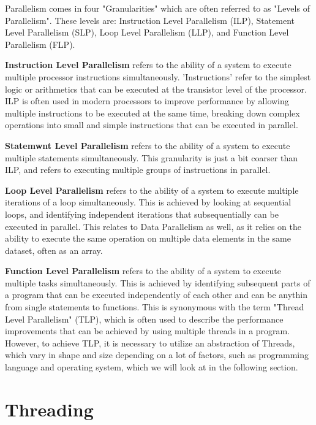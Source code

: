 \documentclass[12pt,a4paper]{article}
\begin{document}
Parallelism comes in four "Granularities"\parencite[p. 4, 114]{Rauber2023} which are often referred to as "Levels of Parallelism". These levels are: Instruction Level Parallelism (ILP), Statement Level Parallelism (SLP), Loop Level Parallelism (LLP), and Function Level Parallelism (FLP).

\textbf{Instruction Level Parallelism} refers to the ability of a system to execute multiple processor instructions simultaneously\parencite[pp. 115-116]{Rauber2023}. 'Instructions' refer to the simplest logic or arithmetics that can be executed at the transistor level of the processor. ILP is often used in modern processors to improve performance by allowing multiple instructions to be executed at the same time, breaking down complex operations into small and simple instructions that can be executed in parallel. 

\textbf{Statemwnt Level Parallelism} refers to the ability of a system to execute multiple statements simultaneously\parencite[pp. 114]{Rauber2023}. This granularity is just a bit coarser than ILP, and refers to executing multiple groups of instructions in parallel.

\textbf{Loop Level Parallelism} refers to the ability of a system to execute multiple iterations of a loop simultaneously\parencite[pp. 118-121]{Rauber2023}. This is achieved by looking at sequential loops, and identifying independent iterations that subsequentially can be executed in parallel. This relates to Data Parallelism\parencite[pp. 116-118]{Rauber2023} as well, as it relies on the ability to execute the same operation on multiple data elements in the same dataset, often as an array. 

\textbf{Function Level Parallelism} refers to the ability of a system to execute multiple tasks simultaneously\parencite[pp. 114, 121-122]{Rauber2023}. This is achieved by identifying subsequent parts of a program that can be executed independently of each other and can be anythin from single statements to functions. This is synonymous with the term "Thread Level Parallelism" (TLP)\parencite[pp. 27-36]{Rauber2023}, which is often used to describe the performance improvements that can be achieved by using multiple threads in a program. However, to achieve TLP, it is necessary to utilize an abstraction of Threads, which vary in shape and size depending on a lot of factors, such as programming language and operating system, which we will look at in the following section.

\section{Threading}
\end{document}
